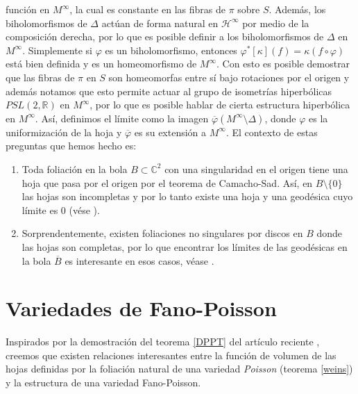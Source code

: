 \documentclass{article}
\newcommand{\co}{\ensuremath{\mathbb C }}
\newcommand{\pslr}{\ensuremath{PSL(2,\mathbb R) }}
\begin{document}
funci\'on en $M^{\infty}$, la cual es constante en las fibras de $\pi$ sobre
$S$.  Adem\'as, los biholomorfismos de $\Delta$ act\'uan de forma natural en
$\mathcal{H}^{\infty}$ por medio de la composici\'on derecha, por lo que es
posible  definir a los biholomorfismos de $\Delta$ en $M^{\infty}$. Simplemente
si $\varphi$ es un biholomorfismo, entonces
$\varphi^{*}[\kappa](f)=\kappa(f\circ\varphi)$ est\'a  bien definida y es un
homeomorfismo de $M^{\infty}$.  Con esto es posible demostrar que las fibras de
$\pi$ en $S$ son homeomorfas entre s\'i bajo  rotaciones por el origen y
adem\'as notamos que esto permite actuar al grupo de isometr\'ias hiperb\'olicas
$\pslr$ en $M^{\infty}$, por lo que es posible hablar de cierta estructura
hiperb\'olica en $M^{\infty}$. As\'i, definimos el l\'imite como la imagen
$\overline{\varphi}(M^{\infty}\setminus\Delta)$, donde $\varphi$ es la
uniformizaci\'on
de la hoja y $\overline{\varphi}$ es su extensi\'on a $M^{\infty}$. El contexto de estas preguntas que hemos hecho es: 
\begin{enumerate}
        \item Toda foliaci\'on en la bola $B\subset\co^2$ con una singularidad en el origen tiene una hoja que pasa por el origen
        por el teorema de Camacho-Sad. As\'i, en $B\setminus\{0\}$ las hojas son incompletas y por lo tanto existe una hoja
        y una geod\'esica cuyo l\'imite es $0$ (v\'ese \cite[teorema 3.3]{brunella}).
        \item Sorprendentemente, existen foliaciones no singulares por discos en $B$ donde las hojas son completas, por lo que 
        encontrar los l\'imites de las geod\'esicas en la bola $\overline{B}$ es interesante en esos casos, v\'ease \cite{A-F}.
\end{enumerate}

\section{Variedades de Fano-Poisson}
\noindent  Inspirados por la demostraci\'on del teorema \ref{DPPT} del art\'iculo reciente \cite{DPPT}, creemos que existen 
relaciones interesantes entre la funci\'on de volumen de las hojas definidas por la foliaci\'on natural de una variedad \emph{Poisson}
(teorema \ref{weins}) y la estructura de una variedad Fano-Poisson.
\end{document}
